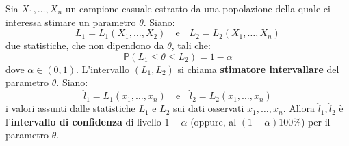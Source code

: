 \documentclass[a4paper]{article}
\theoremstyle{break}
\theoremstyle{break}
\theoremstyle{break}
\theoremstyle{break}
\begin{document}
\begin{definition}
  Sia \( X_1, \ldots, X_n \) un campione casuale estratto da una popolazione della quale
  ci interessa stimare un parametro \( \theta \). Siano:
  \[
  L_1 = L_1(X_1, \ldots, X_2) \quad \text{e} \quad L_2 = L_2(X_1, \ldots, X_n)
  \] 
  due statistiche, che non dipendono da \( \theta \), tali che:
  \[
  \mathbb{P}(L_1 \le \theta \le L_2) = 1 - \alpha
  \] 
  dove \( \alpha \in (0,1) \). L'intervallo \( (L_1, L_2) \) si chiama \textbf{stimatore
  intervallare} del parametro \( \theta \). Siano:
  \[
    \hat{l}_1 = L_1(x_1, \ldots, x_n) \quad \text{e} \quad \hat{l}_2 = L_2(x_1, \ldots, x_n)
  \] 
  i valori assunti dalle statistiche \( L_1 \) e \( L_2 \) sui dati osservati \( x_1, \ldots, x_n \).
  Allora \( \hat{l}_1, \hat{l}_2 \) è l'\textbf{intervallo di confidenza} di livello \( 1- \alpha \) 
  (oppure, al \( (1-\alpha)100\% \)) per il parametro \( \theta \).
\end{definition}
\end{document}
